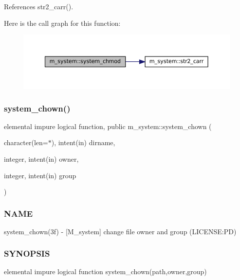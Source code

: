 References str2\+\_\+carr().

Here is the call graph for this function\+:\nopagebreak
\begin{figure}[H]
\begin{center}
\leavevmode
\includegraphics[width=350pt]{namespacem__system_ace9ce0c8a9c8341a76b8903cd2390ce3_cgraph}
\end{center}
\end{figure}
\mbox{\label{namespacem__system_ab89e4d2fb219225c374570d4f9d58e9b}} 
\subsubsection{\texorpdfstring{system\+\_\+chown()}{system\_chown()}}
{\footnotesize\ttfamily elemental impure logical function, public m\+\_\+system\+::system\+\_\+chown (\begin{DoxyParamCaption}\item[{character(len=$\ast$), intent(in)}]{dirname,  }\item[{integer, intent(in)}]{owner,  }\item[{integer, intent(in)}]{group }\end{DoxyParamCaption})}



\subsubsection*{N\+A\+ME}

system\+\_\+chown(3f) -\/ \mbox{[}M\+\_\+system\mbox{]} change file owner and group (L\+I\+C\+E\+N\+SE\+:PD) 

\subsubsection*{S\+Y\+N\+O\+P\+S\+IS}

elemental impure logical function system\+\_\+chown(path,owner,group)

